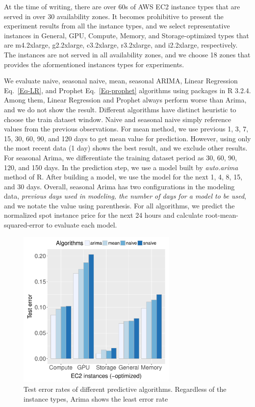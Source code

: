 \documentclass[graybox]{svmult}
\begin{document}
At the time of writing, there are over 60s of AWS EC2 instance types that are served in over 30 availability zones. It becomes prohibitive to present the experiment results from all the instance types, and we select representative instances in General, GPU, Compute, Memory, and Storage-optimized types that are m4.2xlarge, g2.2xlarge, c3.2xlarge, r3.2xlarge, and i2.2xlarge, respectively. The instances are not served in all availability zones, and we choose 18 zones that provides the aformentioned instances types for experiments.

We evaluate naive, seasonal naive, mean, seasonal ARIMA, Linear Regression Eq.~\ref {Eq-LR}, and Prophet Eq.~\ref {Eq-prophet} algorithms using packages in R 3.2.4. Among them, Linear Regression and Prophet always perform worse than Arima, and we do not show the result. Different algorithms have distinct heuristic to choose the train dataset window. Naive and seasonal naive simply reference values from the previous observations. For mean method, we use previous 1, 3, 7, 15, 30, 60, 90, and 120 days to get mean value for prediction. However, using only the most recent data (1 day) shows the best result, and we exclude other results. For seasonal Arima, we differentiate the training dataset period as 30, 60, 90, 120, and 150 days. In the prediction step, we use a model built by \textit{auto.arima} method of R. After building a model, we use the model for the next 1, 4, 8, 15, and 30 days. Overall, seasonal Arima has two configurations in the modeling data, \emph{previous days used in modeling, the number of days for a model to be used}, and we notate the value using parenthesis. For all algorithms, we predict the normalized spot instance price for the next 24 hours and calculate root-mean-squared-error to evaluate each model.   
\begin{figure}
\centering\includegraphics[width=0.7\textwidth]{figures/algorithm-compare-different-instance-type.pdf}\caption{Test error rates of different predictive algorithms. Regardless of the instance types, Arima shows the least error rate\label{fig:algo-diff-inst}}
\end{figure}
\end{document}
